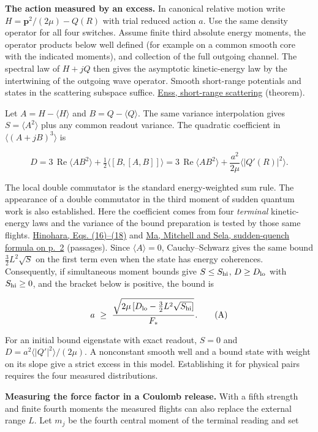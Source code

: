 \documentclass[11pt,a4paper]{article}
\begin{document}
\textbf{The action measured by an excess.} In canonical relative motion
write \(H=\mathbf p^2/(2\mu)-Q(R)\) with trial reduced action \(a\). Use
the same density operator for all four switches. Assume finite third
absolute energy moments, the operator products below well defined (for
example on a common smooth core with the indicated moments), and
collection of the full outgoing channel. The spectral law of \(H+jQ\)
then gives the asymptotic kinetic-energy law by the intertwining of the
outgoing wave operator. Smooth short-range potentials and states in the
scattering subspace suffice.
\href{https://doi.org/10.1007/BF01940771}{Enss, short-range scattering}
(theorem).

Let \(A=H-\langle H\rangle\) and \(B=Q-\langle Q\rangle\). The same
variance interpolation gives \(S=\langle A^2\rangle\) plus any common
readout variance. The quadratic coefficient in
\(\langle(A+jB)^3\rangle\) is

\[
 D=3\,\operatorname{Re}\langle A B^2\rangle
       +\tfrac12\langle[B,[A,B]]\rangle
   =3\,\operatorname{Re}\langle A B^2\rangle
       +\frac{a^2}{2\mu}\langle |Q'(R)|^2\rangle .
\]

The local double commutator is the standard energy-weighted sum rule.
The appearance of a double commutator in the third moment of sudden
quantum work is also established. Here the coefficient comes from four
\emph{terminal} kinetic-energy laws and the variance of the bound
preparation is tested by those same flights.
\href{https://arxiv.org/pdf/1902.11005}{Hinohara, Eqs. (16)--(18)} and
\href{https://arxiv.org/pdf/2502.01601}{Ma, Mitchell and Sela,
sudden-quench formula on p.~2} (passages). Since \(\langle A\rangle=0\),
Cauchy--Schwarz gives the same bound \(\tfrac32L^2\sqrt S\) on the first
term even when the state has energy coherences. Consequently, if
simultaneous moment bounds give \(S\le S_{\rm hi}\), \(D\ge D_{\rm lo}\)
with \(S_{\rm hi}\ge0\), and the bracket below is positive, the bound is

\[
 a\ \ge\
 \frac{\sqrt{2\mu\,[D_{\rm lo}-\tfrac32 L^2\sqrt{S_{\rm hi}}]}}{F_*}.
                                                               \tag{A}
\]

For an initial bound eigenstate with exact readout, \(S=0\) and
\(D=a^2\langle |Q'|^2\rangle/(2\mu)\). A nonconstant smooth well and a
bound state with weight on its slope give a strict excess in this model.
Establishing it for physical pairs requires the four measured
distributions.

\textbf{Measuring the force factor in a Coulomb release.} With a fifth
strength and finite fourth moments the measured flights can also replace
the external range \(L\). Let \(m_j\) be the fourth central moment of
the terminal reading and set
\end{document}

